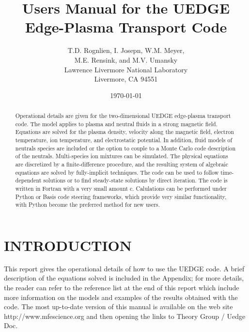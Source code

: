\documentclass [12pt]{article}
\title{Users Manual for the {\sf UEDGE} Edge-Plasma Transport Code}
\author{T.D. Rognlien, I. Josepn, W.M. Meyer, \\ M.E. Rensink, and M.V. Umansky \\
  Lawrence Livermore National Laboratory \\
  Livermore, CA 94551}
\date{\today }
\begin{document}
\maketitle

\begin{abstract}

  Operational details are given for the two-dimensional {\sf UEDGE}
  edge-plasma transport code.  The model applies to plasma and neutral
  fluids in a strong magnetic field. Equations are solved for the
  plasma density, velocity along the magnetic field, electron
  temperature, ion temperature, and electrostatic potential.  In
  addition, fluid models of neutrals species are included or the
  option to couple to a Monte Carlo code description of the neutrals.
  Multi-species ion mixtures can be simulated.  The physical equations
  are discretized by a finite-difference procedure, and the resulting
  system of algebraic equations are solved by fully-implicit
  techniques.  The code can be used to follow time-dependent solutions
  or to find steady-state solutions by direct iteration.  The code is
  written in Fortran with a very small amount c.  Calulations can be
  performed under Python or Basis code steering frameworks, which
  provide very similar functionality, with Python become the preferred
  method for new users.

\end{abstract}

\tableofcontents


\pagebreak

\section{INTRODUCTION}

This report gives the operational details of how to use the {\sf UEDGE} code.
A brief description of the equations solved is included in the Appendix; for
more details, the reader can refer to the reference list at the end of this
report which include more information on the models and examples of the
results obtained with the code. The most up-to-date version of this manual
is available on the web site {\sf http://www.mfescience.org} and then opening
the links to Theory Group / Uedge Doc.
\end{document}
